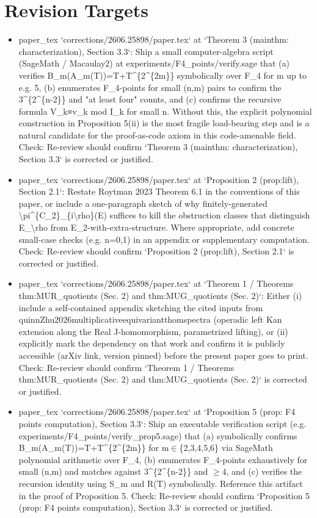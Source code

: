 \documentclass[11pt]{article}
\begin{document}
\section*{Revision Targets}
\begin{itemize}[leftmargin=*]
  \item [open] paper\_tex `corrections/2606.25898/paper.tex` at `Theorem 3 (mainthm: characterization), Section 3.3`: Ship a small computer-algebra script (SageMath / Macaulay2) at experiments/F4\_points/verify.sage that (a) verifies B\_m(A\_m(T))=T+T\^{}\{2\^{}\{2m\}\} symbolically over F\_4 for m up to e.g. 5, (b) enumerates F\_4-points for small (n,m) pairs to confirm the 3\^{}\{2\^{}\{n-2\}\} and "at least four" counts, and (c) confirms the recursive formula V\_k≡v\_k mod I\_k for small n. Without this, the explicit polynomial construction in Proposition 5(ii) is the most fragile load-bearing step and is a natural candidate for the proof-as-code axiom in this code-amenable field. Check: Re-review should confirm `Theorem 3 (mainthm: characterization), Section 3.3` is corrected or justified.
  \item [open] paper\_tex `corrections/2606.25898/paper.tex` at `Proposition 2 (prop:lift), Section 2.1`: Restate Roytman 2023 Theorem 6.1 in the conventions of this paper, or include a one-paragraph sketch of why finitely-generated \textbackslash{}pi\^{}\{C\_2\}\_\{i\textbackslash{}rho\}(E) suffices to kill the obstruction classes that distinguish E\_\textbackslash{}rho from E\_2-with-extra-structure. Where appropriate, add concrete small-case checks (e.g. n=0,1) in an appendix or supplementary computation. Check: Re-review should confirm `Proposition 2 (prop:lift), Section 2.1` is corrected or justified.
  \item [open] paper\_tex `corrections/2606.25898/paper.tex` at `Theorem 1 / Theorems thm:MUR\_quotients (Sec. 2) and thm:MUG\_quotients (Sec. 2)`: Either (i) include a self-contained appendix sketching the cited inputs from quinnZhu2026multiplicativeequivariantthomspectra (operadic left Kan extension along the Real J-homomorphism, parametrized lifting), or (ii) explicitly mark the dependency on that work and confirm it is publicly accessible (arXiv link, version pinned) before the present paper goes to print. Check: Re-review should confirm `Theorem 1 / Theorems thm:MUR\_quotients (Sec. 2) and thm:MUG\_quotients (Sec. 2)` is corrected or justified.
  \item [open] paper\_tex `corrections/2606.25898/paper.tex` at `Proposition 5 (prop: F4 points computation), Section 3.3`: Ship an executable verification script (e.g. experiments/F4\_points/verify\_prop5.sage) that (a) symbolically confirms B\_m(A\_m(T))=T+T\^{}\{2\^{}\{2m\}\} for m\ensuremath{\in}\{2,3,4,5,6\} via SageMath polynomial arithmetic over F\_4, (b) enumerates F\_4-points exhaustively for small (n,m) and matches against 3\^{}\{2\^{}\{n-2\}\} and \ensuremath{\ge}4, and (c) verifies the recursion identity using S\_m and R(T) symbolically. Reference this artifact in the proof of Proposition 5. Check: Re-review should confirm `Proposition 5 (prop: F4 points computation), Section 3.3` is corrected or justified.

\end{itemize}
\end{document}
